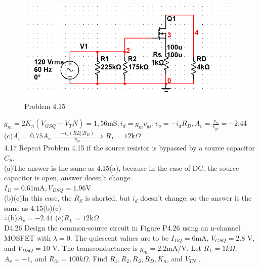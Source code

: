 \documentclass[a4paper,11pt,UTF8]{article}
\begin{document}
\begin{figure}[H] 
	\centering 
	\includegraphics[scale=0.5]{MD4.15_1.png}
	\caption{Problem 4.15}
\end{figure}
\noindent$\displaystyle g_m=2K_n(V_{GSQ}-V_TN)=1,56\mathrm{mS}, i_d=g_mv_{gs},v_o=-i_dR_D, A_v=\frac{v_o}{v_{gs}}=-2.44$\\
(c)$\displaystyle A_v^\prime=0.75A_v=\frac{-i_d(RL||R_D)}{v_{gs}}\Rightarrow R_L=12\mathrm{k}\Omega$\\
4.17 Repeat Problem 4.15 if the source resistor is bypassed by a source capacitor
$C_S$.\\
(a)The answer is the same as 4.15(a), because in the case of DC, the source capacitor is open, answer doesn't change.\\
$I_D=0.61\mathrm{mA},V_{DSQ}=1.96\mathrm{V}$\\
(b)(c)In this case, the $R_S$ is shorted, but $i_d$ doesn't change, so the answer is the same as 4.15(b)(c)\\
$\therefore$(b)$\displaystyle A_v=-2.44$ (c)$R_L=12\mathrm{k}\Omega$\\
D4.26 Design the common-source circuit in Figure P4.26 using an n-channel
MOSFET with $\lambda = 0$. The quiescent values are to be $I_{DQ} = 6 $mA,
$V_{GSQ} = 2.8$ V, and $V_{DSQ} = $10 V. The transconductance is $g_m = 2.2 $mA/V.
Let $R_L = 1 k\Omega$, $A_v = -1$, and $R_{in} = 100 k\Omega$. Find $R_1, R_2, R_S, R_D, K_n$, and $V_{T N}$ .\\
\end{document}
